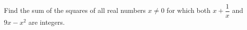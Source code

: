 Find the sum of the squares of all real numbers $x\ne0$ for which both $x+\dfrac{1}{x}$ and $9x-x^2$ are integers.
